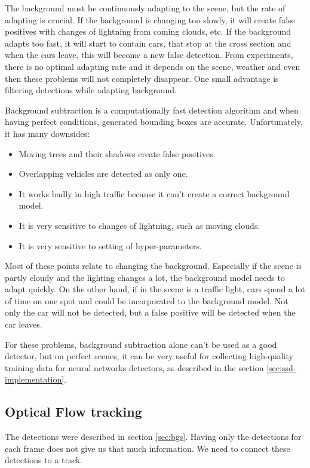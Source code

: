 \documentclass[a4paper,11pt,titlepage,twoside]{article}
\numberwithin{figure}{section}
\begin{document}
The background must be continuously adapting to the scene, but the rate of adapting is crucial. If the background is changing too slowly, it will create false positives with changes of lightning from coming clouds, etc. If the background adapts too fast, it will start to contain cars, that stop at the cross section and when the cars leave, this will become a new false detection. From experiments, there is no optimal adapting rate and it depends on the scene, weather and even then these problems will not completely disappear. One small advantage is filtering detections while adapting background.

Background subtraction is a computationally fast detection algorithm and when having perfect conditions, generated bounding boxes are accurate. Unfortunately, it has many downsides:

\begin{itemize}
\item Moving trees and their shadows create false positives.
\item Overlapping vehicles are detected as only one.
\item It works badly in high traffic because it can't create a correct background model.
\item It is very sensitive to changes of lightning, such as moving clouds.
\item It is very sensitive to setting of hyper-parameters.
\end{itemize}

Most of these points relate to changing the background. Especially if the scene is partly cloudy and the lighting changes a lot, the background model needs to adapt quickly. On the other hand, if in the scene is a traffic light, cars spend a lot of time on one spot and could be incorporated to the background model. Not only the car will not be detected, but a false positive will be detected when the car leaves.

For these problems, background subtraction alone can't be used as a good detector, but on perfect scenes, it can be very useful for collecting high-quality training data for neural networks detectors, as described in the section \ref{sec:ssd-implementation}.

\subsection{Optical Flow tracking}
\label{sec:optical-flow}
The detections were described in section \ref{sec:bgs}. Having only the detections for each frame does not give us that much information. We need to connect these detections to a track.
\end{document}
